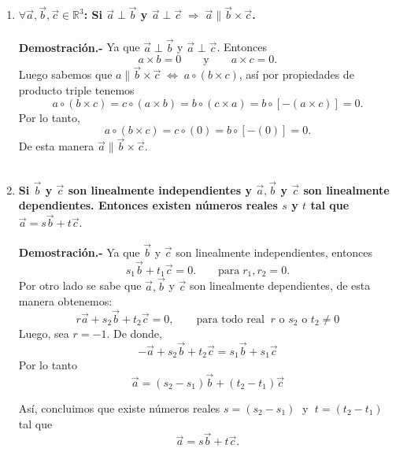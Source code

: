 
\begin{enumerate}

    \item \textbf{\boldmath $\forall \vec{a},\vec{b},\vec{c} \in \mathbb{R}^3$: Si $\vec{a} \perp \vec{b}$ y $\vec{a}\perp \vec{c}\; \Rightarrow \; \vec{a} \parallel \vec{b}\times \vec{c}$.\\\\
	Demostración.-}\; Ya que $\vec{a}\perp \vec{b}$ y $\vec{a}\perp\vec{c}$. Entonces 
	$$a\times b=0\qquad \mbox{y}\qquad a\times c = 0.$$
	Luego sabemos que $a\parallel \vec{b}\times \vec{c} \;\Leftrightarrow\; a\circ(b\times c)$, así por propiedades de producto triple tenemos
	$$a\circ (b\times c) = c\circ (a\times b)=b\circ (c\times a) = b\circ \left[-(a\times c)\right]=0.$$
	Por lo tanto,
	$$a\circ (b\times c) = c\circ (0) = b\circ \left[-(0)\right]=0.$$
	De esta manera $\vec{a}\parallel \vec{b}\times \vec{c}.$\\\\

    \item \textbf{\boldmath Si $\vec{b}$ y $\vec{c}$ son linealmente independientes y $\vec{a},\vec{b}$ y $\vec{c}$ son linealmente dependientes. Entonces existen números reales $s$ y $t$ tal que $\vec{a}=s\vec{b}+t\vec{c}.$\\\\
	Demostración.-}\; Ya que $\vec{b}$ y $\vec{c}$ son linealmente independientes, entonces 
	$$s_1\vec{b}+t_1\vec{c}=0. \qquad \mbox{para}\; r_1,r_2=0.$$
	Por otro lado se sabe que $\vec{a},\vec{b}$ y $\vec{c}$ son linealmente dependientes, de esta manera obtenemos: 
	$$r\vec{a}+s_2\vec{b}+t_2\vec{c}=0,\qquad \mbox{para todo real}\;\; r \mbox{ o } s_2 \mbox{ o } t_2\neq 0$$
	Luego, sea $r=-1$. De donde, 
	$$-\vec{a}+s_2\vec{b}+t_2\vec{c}=s_1\vec{b}+s_1\vec{c}$$
	Por lo tanto 
	$$\vec{a}=(s_2-s_1)\vec{b}+(t_2-t_1)\vec{c}$$

	Así, concluimos que existe números reales $s=(s_2-s_1)\;$ y $\;t=(t_2-t_1)$ tal que 
	$$\vec{a}=s\vec{b}+t\vec{c}.$$\\

\end{enumerate}

